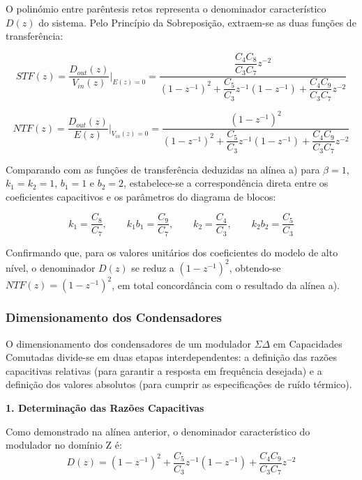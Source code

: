 O polinómio entre parêntesis retos representa o denominador característico $D(z)$ do sistema.
Pelo Princípio da Sobreposição, extraem-se as duas funções de transferência:

\begin{equation*}
    STF(z) = \frac{D_{out}(z)}{V_{in}(z)} \Bigg|_{E(z)=0} = \frac{\dfrac{C_4 C_8}{C_3 C_7} z^{-2}}{(1 - z^{-1})^2 + \dfrac{C_5}{C_3} z^{-1}(1 - z^{-1}) + \dfrac{C_4 C_9}{C_3 C_7} z^{-2}}
\end{equation*}

\begin{equation*}
    NTF(z) = \frac{D_{out}(z)}{E(z)} \Bigg|_{V_{in}(z)=0} = \frac{(1 - z^{-1})^2}{(1 - z^{-1})^2 + \dfrac{C_5}{C_3} z^{-1}(1 - z^{-1}) + \dfrac{C_4 C_9}{C_3 C_7} z^{-2}}
\end{equation*}

Comparando com as funções de transferência deduzidas na alínea a) para $\beta=1$, $k_1=k_2=1$,
$b_1=1$ e $b_2=2$, estabelece-se a correspondência direta entre os coeficientes capacitivos
e os parâmetros do diagrama de blocos:

\begin{equation*}
    k_1 = \frac{C_8}{C_7}, \qquad k_1 b_1 = \frac{C_9}{C_7}, \qquad k_2 = \frac{C_4}{C_3}, \qquad k_2 b_2 = \frac{C_5}{C_3}
\end{equation*}

Confirmando que, para os valores unitários dos coeficientes do modelo de alto nível, o denominador
$D(z)$ se reduz a $(1-z^{-1})^2$, obtendo-se $NTF(z) = (1-z^{-1})^2$, em total concordância
com o resultado da alínea a).


\vspace{0.5cm}
\subsubsection{Dimensionamento dos Condensadores}

O dimensionamento dos condensadores de um modulador $\Sigma\Delta$ em Capacidades Comutadas
divide-se em duas etapas interdependentes: a definição das razões capacitivas relativas (para
garantir a resposta em frequência desejada) e a definição dos valores absolutos (para cumprir
as especificações de ruído térmico).

\textbf{1. Determinação das Razões Capacitivas}

Como demonstrado na alínea anterior, o denominador característico do modulador no domínio Z é:
\begin{equation}
    D(z) = (1 - z^{-1})^2 + \frac{C_5}{C_3} z^{-1}(1 - z^{-1}) + \frac{C_4 C_9}{C_3 C_7} z^{-2}
\end{equation}

